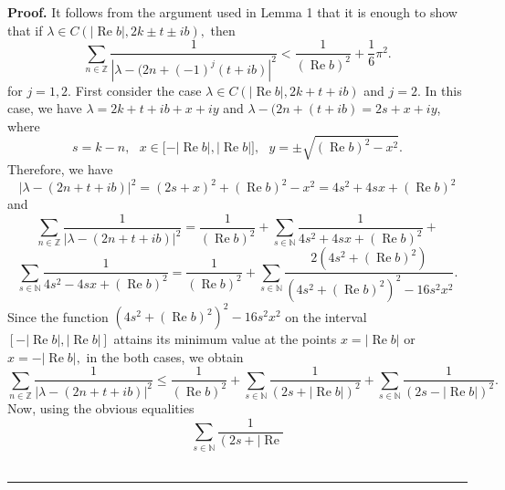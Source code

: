 \documentclass{article}%
\newenvironment{proof}[1][Proof]{\textbf{#1.} }{\ \rule{0.5em}{0.5em}}
\begin{document}
\begin{proof}
It follows from the argument used in Lemma 1 that it is enough to show that if
$\lambda\in C(\left\vert \operatorname{Re}b\right\vert ,2k\pm t\pm ib),$ then
\begin{equation}
\sum_{n\in\mathbb{Z}}\frac{1}{\left\vert \lambda-(2n+\left(  -1\right)
^{j}(t+ib)\right\vert ^{2}}<\frac{1}{\left(  \operatorname{Re}b\right)  ^{2}%
}+\frac{1}{6}\pi^{2}. \tag{36}%
\end{equation}
for $j=1,2.$ First consider the case $\lambda\in C(\left\vert
\operatorname{Re}b\right\vert ,2k+t+ib)$ and $j=2.$ In this case, we have
$\lambda=2k+t+ib+x+iy$ and $\lambda-(2n+(t+ib)=2s+x+iy$, where
\[
s=k-n,\text{ }x\in\lbrack-\left\vert \operatorname{Re}b\right\vert ,\left\vert
\operatorname{Re}b\right\vert ],\text{ }y=\pm\sqrt{\left(  \operatorname{Re}%
b\right)  ^{2}-x^{2}}.
\]
Therefore, we have
\begin{equation}
\left\vert \lambda-(2n+t+ib)\right\vert ^{2}=\left(  2s+x\right)  ^{2}+\left(
\operatorname{Re}b\right)  ^{2}-x^{2}=4s^{2}+4sx+\left(  \operatorname{Re}%
b\right)  ^{2} \tag{37}%
\end{equation}
and
\[
\sum_{n\in\mathbb{Z}}\frac{1}{\left\vert \lambda-(2n+t+ib)\right\vert ^{2}%
}=\frac{1}{\left(  \operatorname{Re}b\right)  ^{2}}+\sum_{s\in\mathbb{N}}%
\frac{1}{4s^{2}+4sx+\left(  \operatorname{Re}b\right)  ^{2}}+
\]%
\[
\sum_{s\in\mathbb{N}}\frac{1}{4s^{2}-4sx+\left(  \operatorname{Re}b\right)
^{2}}=\frac{1}{\left(  \operatorname{Re}b\right)  ^{2}}+\sum_{s\in\mathbb{N}%
}\frac{2(4s^{2}+\left(  \operatorname{Re}b\right)  ^{2})}{(4s^{2}+\left(
\operatorname{Re}b\right)  ^{2})^{2}-16s^{2}x^{2}}.
\]
Since the function $(4s^{2}+\left(  \operatorname{Re}b\right)  ^{2}%
)^{2}-16s^{2}x^{2}$ on the interval $[-\left\vert \operatorname{Re}%
b\right\vert ,\left\vert \operatorname{Re}b\right\vert ]$ attains its minimum
value at the points $x=\left\vert \operatorname{Re}b\right\vert $ or
$x=-\left\vert \operatorname{Re}b\right\vert ,$ in the both cases, we obtain
\begin{equation}
\sum_{n\in\mathbb{Z}}\frac{1}{\left\vert \lambda-(2n+t+ib)\right\vert ^{2}%
}\leq\frac{1}{\left(  \operatorname{Re}b\right)  ^{2}}+\sum_{s\in\mathbb{N}%
}\frac{1}{\left(  2s+\left\vert \operatorname{Re}b\right\vert \right)  ^{2}%
}+\sum_{s\in\mathbb{N}}\frac{1}{\left(  2s-\left\vert \operatorname{Re}%
b\right\vert \right)  ^{2}}. \tag{38}%
\end{equation}
Now, using the obvious equalities
\[
\sum_{s\in\mathbb{N}}\frac{1}{\left(  2s+\left\vert \operatorname{Re}%
}\]
\end{proof}
\end{document}
